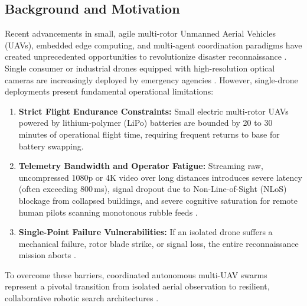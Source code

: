 \documentclass[journal]{IEEEtran}
\begin{document}
\subsection{Background and Motivation}
Recent advancements in small, agile multi-rotor Unmanned Aerial Vehicles (UAVs), embedded edge computing, and multi-agent coordination paradigms have created unprecedented opportunities to revolutionize disaster reconnaissance \cite{2}. Single consumer or industrial drones equipped with high-resolution optical cameras are increasingly deployed by emergency agencies \cite{3}. However, single-drone deployments present fundamental operational limitations:
\begin{enumerate}
    \item \textbf{Strict Flight Endurance Constraints:} Small electric multi-rotor UAVs powered by lithium-polymer (LiPo) batteries are bounded by 20 to 30 minutes of operational flight time, requiring frequent returns to base for battery swapping.
    \item \textbf{Telemetry Bandwidth and Operator Fatigue:} Streaming raw, uncompressed 1080p or 4K video over long distances introduces severe latency (often exceeding 800\,ms), signal dropout due to Non-Line-of-Sight (NLoS) blockage from collapsed buildings, and severe cognitive saturation for remote human pilots scanning monotonous rubble feeds \cite{16}.
    \item \textbf{Single-Point Failure Vulnerabilities:} If an isolated drone suffers a mechanical failure, rotor blade strike, or signal loss, the entire reconnaissance mission aborts \cite{21}.
\end{enumerate}

To overcome these barriers, coordinated autonomous multi-UAV swarms represent a pivotal transition from isolated aerial observation to resilient, collaborative robotic search architectures \cite{1, 2}.
\end{document}
